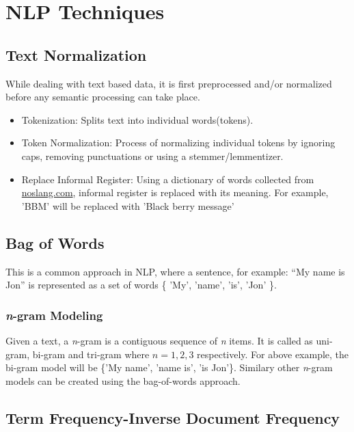 \section{NLP Techniques}

\subsection{Text Normalization}

While dealing with text based data, it is first  preprocessed and/or normalized before any semantic processing can take place. 

\begin{itemize}
\item {Tokenization:} Splits text into individual words(tokens).
\item {Token Normalization:} Process of normalizing individual tokens by ignoring caps, removing punctuations or using a stemmer/lemmentizer. 
\item {Replace Informal Register:} Using a dictionary of words collected from \url{noslang.com}, informal register is replaced with its meaning. For example, 'BBM' will be replaced with 'Black berry message'
\end{itemize}

\subsection{Bag of Words}

This is a common approach in NLP, where a sentence, for example: ``My name is Jon'' is represented as a set of words \{ 'My', 'name', 'is', 'Jon' \}.

\subsubsection{\emph{n}-gram Modeling}

Given a text, a \emph{n}-gram is  a contiguous sequence of \emph{n} items. It is called as uni-gram, bi-gram and tri-gram where $n=1,2,3$ respectively. For above example, the bi-gram model will be \{'My name', 'name is', 'is Jon'\}. Similary other \emph{n}-gram models can be created using the bag-of-words approach.




\subsection{Term Frequency-Inverse Document Frequency}

